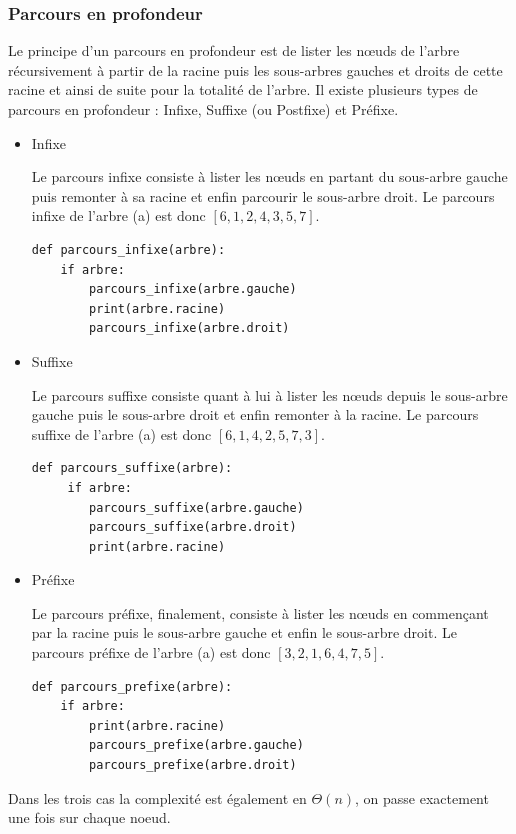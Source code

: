 \documentclass{report}
\begin{document}
\subsubsection{Parcours en profondeur}
Le principe d'un parcours en profondeur est de lister les nœuds de l'arbre récursivement à partir de la racine puis les sous-arbres gauches et droits de cette racine et ainsi de suite pour la totalité de l'arbre.
Il existe plusieurs types de parcours en profondeur : Infixe, Suffixe (ou Postfixe) et Préfixe.
\begin{itemize}
\item Infixe

Le parcours infixe consiste à lister les nœuds en partant du sous-arbre gauche puis remonter à sa racine et enfin parcourir le sous-arbre droit.
Le parcours infixe de l'arbre (a) est donc $[6, 1, 2, 4, 3, 5, 7]$.
\begin{lstlisting}
def parcours_infixe(arbre): 
    if arbre: 
        parcours_infixe(arbre.gauche) 
        print(arbre.racine)
        parcours_infixe(arbre.droit) 
\end{lstlisting}

\item Suffixe

Le parcours suffixe consiste quant à lui à lister les nœuds depuis le sous-arbre gauche puis le sous-arbre droit et enfin remonter à la racine.
Le parcours suffixe de l'arbre (a) est donc $[6, 1, 4, 2, 5, 7, 3]$.
\begin{lstlisting}
def parcours_suffixe(arbre): 
     if arbre: 
        parcours_suffixe(arbre.gauche) 
        parcours_suffixe(arbre.droit) 
        print(arbre.racine)
\end{lstlisting}

\item Préfixe

Le parcours préfixe, finalement, consiste à lister les nœuds en commençant par la racine puis le sous-arbre gauche et enfin le sous-arbre droit.
Le parcours préfixe de l'arbre (a) est donc $[3, 2, 1, 6, 4, 7, 5]$.
\begin{lstlisting}
def parcours_prefixe(arbre):
    if arbre:
        print(arbre.racine)
        parcours_prefixe(arbre.gauche)
        parcours_prefixe(arbre.droit)
\end{lstlisting}

\end{itemize}

Dans les trois cas la complexité est également en $\Theta(n)$, on passe exactement une fois sur chaque noeud. 
\end{document}
